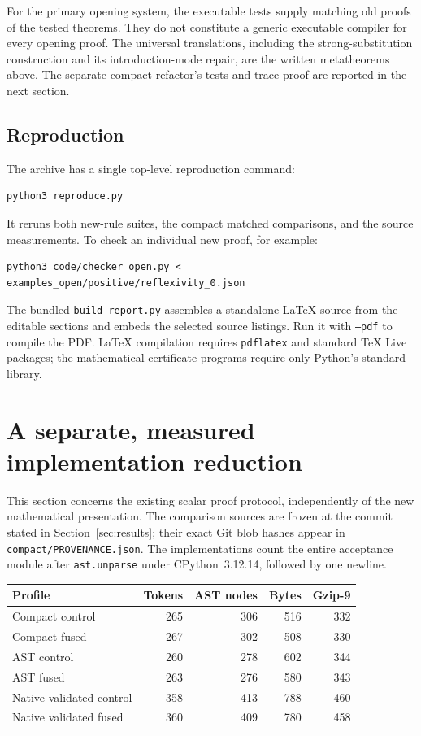 \documentclass[11pt,letterpaper]{article}
\theoremstyle{definition}
\begin{document}
For the primary opening system, the executable tests supply matching old
proofs of the tested theorems.  They do not constitute a generic executable
compiler for every opening proof.  The universal translations, including
the strong-substitution construction and its introduction-mode repair,
are the written metatheorems above.  The separate compact refactor's tests
and trace proof are reported in the next section.

\subsection{Reproduction}

The archive has a single top-level reproduction command:
\begin{verbatim}
python3 reproduce.py
\end{verbatim}
It reruns both new-rule suites, the compact matched comparisons, and the
source measurements.  To check an individual new proof, for example:
\begin{verbatim}
python3 code/checker_open.py < examples_open/positive/reflexivity_0.json
\end{verbatim}
The bundled \texttt{build\_report.py} assembles a standalone LaTeX source
from the editable sections and embeds the selected source listings.  Run
it with \texttt{--pdf} to compile the PDF.  LaTeX compilation requires
\texttt{pdflatex} and standard TeX Live packages; the mathematical
certificate programs require only Python's standard library.


\section{A separate, measured implementation reduction}
\label{sec:continuation-fusion}

This section concerns the existing scalar proof protocol, independently of
the new mathematical presentation. The comparison sources are frozen at
the commit stated in Section~\ref{sec:results}; their exact Git blob hashes
appear in \texttt{compact/PROVENANCE.json}.
The implementations count the entire acceptance module after
\texttt{ast.unparse} under CPython~3.12.14, followed by one newline.

\begin{center}
\begin{tabular}{lrrrr}
\hline
Profile & Tokens & AST nodes & Bytes & Gzip-9\\
\hline
Compact control &265&306&516&332\\
Compact fused &267&302&508&330\\
AST control &260&278&602&344\\
AST fused &263&276&580&343\\
Native validated control &358&413&788&460\\
Native validated fused &360&409&780&458\\
\hline
\end{tabular}
\end{center}
\end{document}
